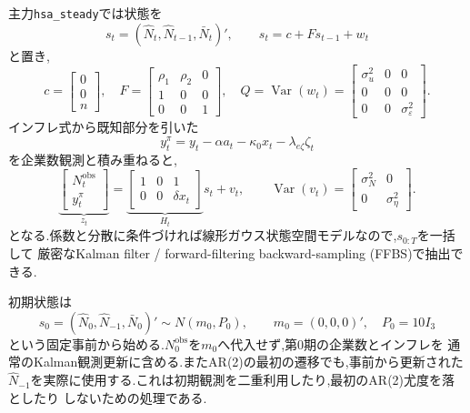 \documentclass[11pt]{article}
\newcommand{\code}[1]{\texttt{#1}}
\begin{document}
主力\code{hsa\_steady}では状態を
\begin{equation}
s_t=(\hat N_t,\hat N_{t-1},\bar N_t)',\qquad
s_t=c+Fs_{t-1}+w_t
\end{equation}
と置き,
\begin{equation}
c=\begin{bmatrix}0\\0\\n\end{bmatrix},\quad
F=\begin{bmatrix}\rho_1&\rho_2&0\\1&0&0\\0&0&1\end{bmatrix},\quad
Q=\operatorname{Var}(w_t)
=\begin{bmatrix}\sigma_u^2&0&0\\0&0&0\\0&0&\sigma_\varepsilon^2\end{bmatrix}.
\label{eq:state-matrices}
\end{equation}
インフレ式から既知部分を引いた
\begin{equation}
y_t^\pi=y_t-\alpha a_t-\kappa_0x_t
-\lambda_{e\zeta}\zeta_t
\end{equation}
を企業数観測と積み重ねると,
\begin{equation}
\underbrace{\begin{bmatrix}N_t^{\mathrm{obs}}\\y_t^\pi\end{bmatrix}}_{z_t}
=
\underbrace{\begin{bmatrix}1&0&1\\0&0&\delta x_t\end{bmatrix}}_{H_t}s_t
+v_t,\qquad
\operatorname{Var}(v_t)=
\begin{bmatrix}\sigma_N^2&0\\0&\sigma_\eta^2\end{bmatrix}.
\label{eq:steady-measurement-matrix}
\end{equation}
となる.係数と分散に条件づければ線形ガウス状態空間モデルなので,$s_{0:T}$を一括して
厳密なKalman filter / forward-filtering backward-sampling (FFBS)で抽出できる.

初期状態は
\begin{equation}
s_0=(\hat N_0,\hat N_{-1},\bar N_0)'\sim N(m_0,P_0),\qquad
m_0=(0,0,0)',\quad P_0=10I_3
\label{eq:initial-state}
\end{equation}
という固定事前から始める.$N_0^{\mathrm{obs}}$を$m_0$へ代入せず,第0期の企業数とインフレを
通常のKalman観測更新に含める.またAR(2)の最初の遷移でも,事前から更新された
$\hat N_{-1}$を実際に使用する.これは初期観測を二重利用したり,最初のAR(2)尤度を落としたり
しないための処理である.
\end{document}
